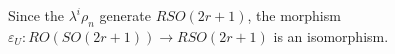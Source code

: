 Since the $\lambda^i \rho_n$ generate $RSO(2r + 1)$, the morphism $\varepsilon_U: RO(SO(2r + 1)) \rightarrow RSO(2r + 1)$ is an isomorphism.

